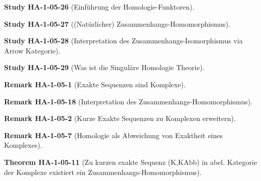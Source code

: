 \documentclass[10pt, letterpaper]{article}
\newcommand{\CustomHeading}[3]{%
  \par\medskip\noindent%
  \textbf{#1 #2} \textnormal{(#3)}.\enskip%
}
\newenvironment{THEO}[2]{\CustomHeading{Theorem}{#1}{#2}}{}
\newenvironment{REM}[2]{\CustomHeading{Remark}{#1}{#2}}{}
\newenvironment{STUD}[2]{\CustomHeading{Study}{#1}{#2}}{}
\begin{document}
\begin{STUD}{HA-1-05-26}{Einführung der Homologie-Funktoren}

\end{STUD}

\begin{STUD}{HA-1-05-27}{(Natürlicher) Zusammenhangs-Homomorphismus}

\end{STUD}

\begin{STUD}{HA-1-05-28}{Interpretation des Zusammenhangs-Isomorphismus via Arrow Kategorie}

\end{STUD}

\begin{STUD}{HA-1-05-29}{Was ist die Singuläre Homologie Theorie}

\end{STUD}











\begin{REM}{HA-1-05-1}{Exakte Sequenzen sind Komplexe}

\end{REM}

\begin{REM}{HA-1-05-18}{Interpretation des Zusammenhangs-Homomorphismus}

\end{REM}

\begin{REM}{HA-1-05-2}{Kurze Exakte Sequenzen zu Komplexen erweitern}

\end{REM}

\begin{REM}{HA-1-05-7}{Homologie als Abweichung von Exaktheit eines Komplexes}

\end{REM}











\begin{THEO}{HA-1-05-11}{Zu kurzen exakte Sequenz (K,KAbb) in abel. Kategorie der Komplexe existiert ein Zusammenhangs-Homomorphismus}

\end{THEO}
\end{document}
